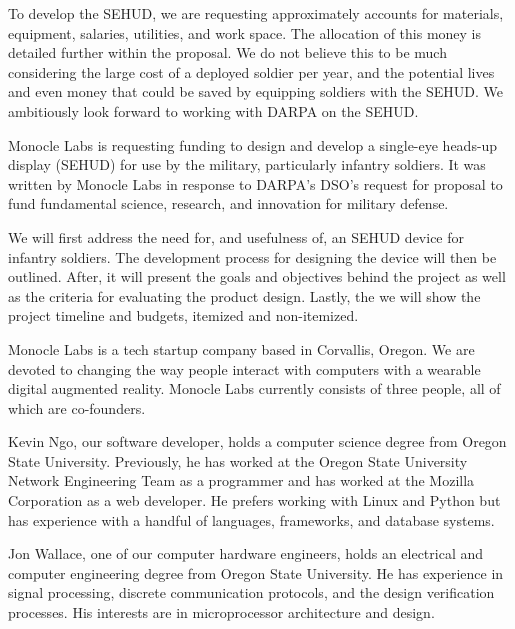To develop the SEHUD, we are requesting approximately
accounts for materials, equipment, salaries, utilities, and work
space. The allocation of this money is detailed further within the
proposal. We do not believe this to be much considering the large cost
of a deployed soldier per year, and the potential lives and even money
that could be saved by equipping soldiers with the SEHUD. We
ambitiously look forward to working with DARPA on the SEHUD.




















Monocle Labs is requesting funding to design and develop a single-eye heads-up
display (SEHUD) for use by the military, particularly infantry soldiers. It was
written by Monocle Labs in response to DARPA's DSO's request for proposal to
fund fundamental science, research, and innovation for military defense.


We will first address the need for, and usefulness of, an SEHUD
device for infantry soldiers. The development process for designing the device
will then be outlined. After, it will present the goals and objectives behind
the project as well as the criteria for evaluating the product design. Lastly,
the we will show the project timeline and budgets, itemized and
non-itemized.


Monocle Labs is a tech startup company based in Corvallis, Oregon. We are
devoted to changing the way people interact with computers with a wearable
digital augmented reality. Monocle Labs currently consists of three people, all
of which are co-founders.

Kevin Ngo, our software developer, holds a computer science degree from
Oregon State University. Previously, he has worked at the Oregon State
University Network Engineering Team as a programmer and has worked at the
Mozilla Corporation as a web developer. He prefers working with Linux and
Python but has experience with a handful of languages, frameworks, and database
systems.

Jon Wallace, one of our computer hardware engineers, holds an electrical
and computer engineering degree from Oregon State University. He has experience
in signal processing, discrete communication protocols, and the design
verification processes. His interests are in microprocessor architecture and
design.

